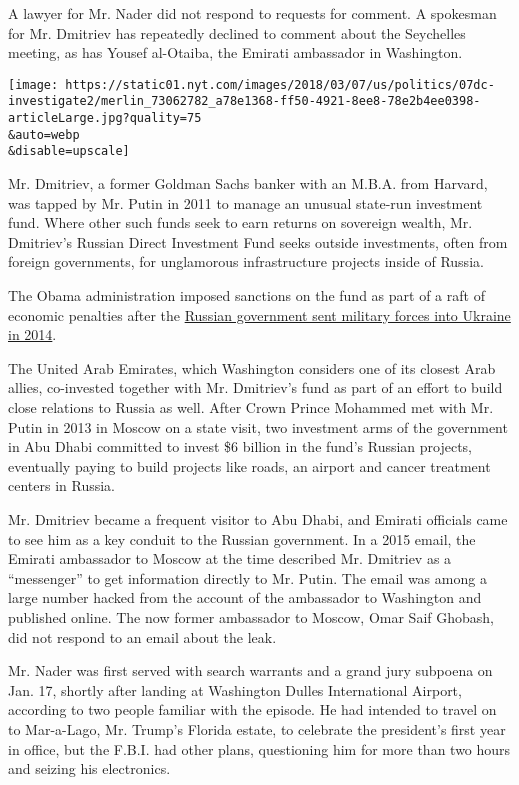 A lawyer for Mr. Nader did not respond to requests for comment. A
spokesman for Mr. Dmitriev has repeatedly declined to comment about the
Seychelles meeting, as has Yousef al-Otaiba, the Emirati ambassador in
Washington.

\texttt{[image: https://static01.nyt.com/images/2018/03/07/us/politics/07dc-investigate2/merlin\_73062782\_a78e1368-ff50-4921-8ee8-78e2b4ee0398-articleLarge.jpg?quality=75\\\&auto=webp\\\&disable=upscale]}

Mr. Dmitriev, a former Goldman Sachs banker with an M.B.A. from Harvard,
was tapped by Mr. Putin in 2011 to manage an unusual state-run
investment fund. Where other such funds seek to earn returns on
sovereign wealth, Mr. Dmitriev's Russian Direct Investment Fund seeks
outside investments, often from foreign governments, for unglamorous
infrastructure projects inside of Russia.

The Obama administration imposed sanctions on the fund as part of a raft
of economic penalties after the
\href{https://www.nytimes.com/2014/03/19/world/europe/ukraine.html}{Russian
government sent military forces into Ukraine in 2014}.

The United Arab Emirates, which Washington considers one of its closest
Arab allies, co-invested together with Mr. Dmitriev's fund as part of an
effort to build close relations to Russia as well. After Crown Prince
Mohammed met with Mr. Putin in 2013 in Moscow on a state visit, two
investment arms of the government in Abu Dhabi committed to invest \$6
billion in the fund's Russian projects, eventually paying to build
projects like roads, an airport and cancer treatment centers in Russia.

Mr. Dmitriev became a frequent visitor to Abu Dhabi, and Emirati
officials came to see him as a key conduit to the Russian government. In
a 2015 email, the Emirati ambassador to Moscow at the time described Mr.
Dmitriev as a ``messenger'' to get information directly to Mr. Putin.
The email was among a large number hacked from the account of the
ambassador to Washington and published online. The now former ambassador
to Moscow, Omar Saif Ghobash, did not respond to an email about the
leak.

Mr. Nader was first served with search warrants and a grand jury
subpoena on Jan. 17, shortly after landing at Washington Dulles
International Airport, according to two people familiar with the
episode. He had intended to travel on to Mar-a-Lago, Mr. Trump's Florida
estate, to celebrate the president's first year in office, but the
F.B.I. had other plans, questioning him for more than two hours and
seizing his electronics.

